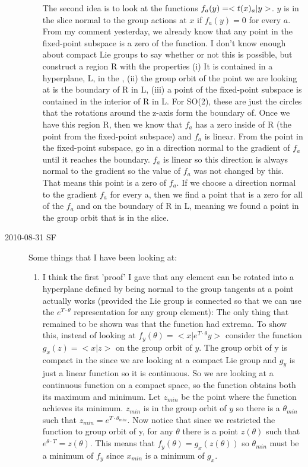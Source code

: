 \begin{description}
\begin{enumerate}
The second idea is to look at the functions $f_a(y)=<t(x)_a| y>$. $ y$ is in the slice normal to the group actions at $x$ if $f_a(y)=0$ for every $a$. From my comment yesterday, we already know that any point in the fixed-point subspace is a zero of the function. I don't know enough about compact Lie groups to say whether or not this is possible, but construct a region R with the properties (i) It is contained in a hyperplane, L, in the {\statesp}, (ii) the group orbit of the point we are looking at is the boundary of R in L, (iii) a point of the fixed-point subspace is contained in the interior of R in L. For SO(2), these are just the circles that the rotations around the z-axis form the boundary of. Once we have this region R, then we know that $f_a$ has a zero inside of R (the point from the fixed-point subspace) and $f_a$ is linear. From the point in the fixed-point subspace, go in a direction normal to the gradient of $f_a$ until it reaches the boundary. $f_a$ is linear so this direction is always normal to the gradient so the value of $f_a$ was not changed by this. That means this point is a zero of $f_a$. If we choose a direction normal to the gradient $f_a$ for every a, then we find a point that is a zero for all of the $f_a$ and on the boundary of R in L, meaning we found a point in the group orbit that is in the slice.
\end{enumerate}

\item[2010-08-31 SF]
Some things that I have been looking at:

\begin{enumerate}
\item
I think the first 'proof' I gave that any element can be rotated into a hyperplane defined by being normal to the group tangents at a point actually works (provided the Lie group is connected so that we can use the $e^{T \cdot \theta}$ representation for any group element): The only thing that remained to be shown was that the function had extrema. To show this, instead of looking at $f_y(\theta)=<x|e^{T \cdot \theta} y>$ consider the function $g_x(z)=<x|z>$ on the group orbit of $y$. The group orbit of y is compact in the {\statesp} since we are looking at a compact Lie group and $g_y$ is just a linear function so it is continuous. So we are looking at a continuous function on a compact space, so the function obtains both its maximum and minimum. Let $z_{min}$ be the point where the function achieves its minimum. $z_{min}$ is in the group orbit of $y$ so there is a $\theta_{min}$ such that $z_{min}=e^{T \cdot \theta_{min}}$. Now notice that since we restricted the function to group orbit of y, for any $\theta$ there is a point $z(\theta)$ such that $e^{\theta \cdot T}=z(\theta)$. This means that $f_y(\theta)=g_x(z(\theta))$ so $\theta_{min}$ must be a minimum of $f_y$ since $x_{min}$ is a minimum of $g_x$.


\end{enumerate}
\end{description}
